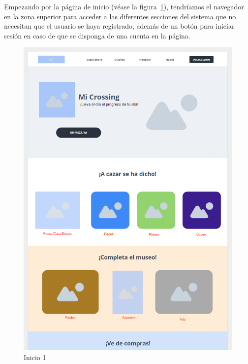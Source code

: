 Empezando por la página de inicio (v\'ease la figura~\ref{fig:inicio1}), tendríamos el navegador en la zona superior para acceder a las diferentes secciones del sistema que no necesitan que el usuario se haya registrado, además de un botón para iniciar sesión en caso de que se disponga de una cuenta en la página.\\

\begin{figure}[!htb]
	\begin{minipage}{0.48\textwidth}
		\centering
		\includegraphics[width=\linewidth]{img/mockups/Inicio - 1.png}
		\caption{Inicio 1}
		\label{fig:inicio1}
	\end{minipage}\hfill
	\begin{minipage}{0.48\textwidth}
		\centering

\end{minipage}
\end{figure}
